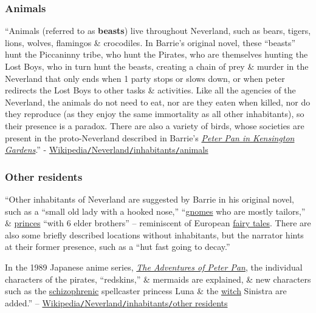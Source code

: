 \documentclass[oneside]{book}
\numberwithin{equation}{section}
\begin{document}
\subsubsection{Animals}
``Animals (referred to as \textbf{beasts}) live throughout Neverland, such as bears, tigers, lions, wolves, flamingos \& crocodiles. In Barrie's original novel, these ``beasts'' hunt the Piccaninny tribe, who hunt the Pirates, who are themselves hunting the Lost Boys, who in turn hunt the beasts, creating a chain of prey \& murder in the Neverland that only ends when 1 party stops or slows down, or when peter redirects the Lost Boys to other tasks \& activities. Like all the agencies of the Neverland, the animals do not need to eat, nor are they eaten when killed, nor do they reproduce (as they enjoy the same immortality as all other inhabitants), so their presence is a paradox. There are also a variety of birds, whose societies are present in the proto-Neverland described in Barrie's \href{https://en.wikipedia.org/wiki/Peter_Pan_in_Kensington_Gardens}{\textit{Peter Pan in Kensington Gardens}}.'' - \href{https://en.wikipedia.org/wiki/Neverland#Animals}{Wikipedia\texttt{/}Neverland\texttt{/}inhabitants\texttt{/}animals}

\subsubsection{Other residents}
``Other inhabitants of Neverland are suggested by Barrie in his original novel, such as a ``small old lady with a hooked nose,'' ``\href{https://en.wikipedia.org/wiki/Gnome}{gnomes} who are mostly tailors,'' \& \href{https://en.wikipedia.org/wiki/Prince}{princes} ``with 6 elder brothers'' -- reminiscent of European \href{https://en.wikipedia.org/wiki/Fairy_tale}{fairy tales}. There are also some briefly described locations without inhabitants, but the narrator hints at their former presence, such as a ``hut fast going to decay.''

In the 1989 Japanese anime series, \href{https://en.wikipedia.org/wiki/Peter_Pan:_The_Animated_Series}{\textit{The Adventures of Peter Pan}}, the individual characters of the pirates, ``redskins,'' \& mermaids are explained, \& new characters such as the \href{https://en.wikipedia.org/wiki/Schizophrenia}{schizophrenic} spellcaster princess Luna \& the \href{https://en.wikipedia.org/wiki/Witchcraft}{witch} Sinistra are added.'' -- \href{https://en.wikipedia.org/wiki/Neverland#Other_residents}{Wikipedia\texttt{/}Neverland\texttt{/}inhabitants\texttt{/}other residents}
\end{document}
